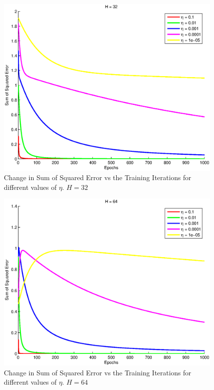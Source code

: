\documentclass{article}
\newcommand{\myScale}{0.56}
\begin{document}
\begin{figure}[H]
\includegraphics[scale=\myScale]{../eps2/H32.eps}
\caption{Change in Sum of Squared Error vs the Training Iterations for different values of $\eta$. $H=32$}
\label{fig:fig10}
\end{figure}
\begin{figure}[H]
\includegraphics[scale=\myScale]{../eps2/H64.eps}
\caption{Change in Sum of Squared Error vs the Training Iterations for different values of $\eta$. $H=64$}
\label{fig:fig11}
\end{figure}
\end{document}
